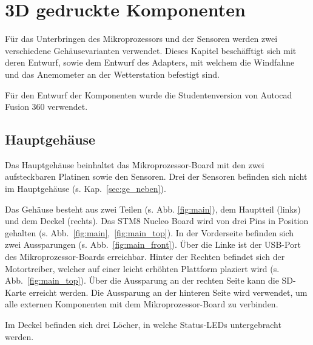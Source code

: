 \pagebreak
\section{3D gedruckte Komponenten}\label{sec:gehaeuse}
Für das Unterbringen des Mikroprozessors und der Sensoren werden zwei verschiedene Gehäusevarianten verwendet. Dieses Kapitel beschäfftigt sich mit deren Entwurf, sowie dem Entwurf des Adapters, mit welchem die Windfahne und das Anemometer an der Wetterstation befestigt sind.

Für den Entwurf der Komponenten wurde die Studentenversion von Autocad Fusion 360 verwendet.

\subsection{Hauptgehäuse}\label{sec:ge_haupt}
Das Hauptgehäuse beinhaltet das Mikroprozessor-Board mit den zwei aufsteckbaren Platinen sowie den Sensoren. Drei der Sensoren befinden sich nicht im Hauptgehäuse (s. Kap.~\ref{sec:ge_neben}).

Das Gehäuse besteht aus zwei Teilen (s. Abb. \ref{fig:main}), dem Hauptteil (links) und dem Deckel (rechts). Das STM8 Nucleo Board wird von drei Pins in Position gehalten (s. Abb.~\ref{fig:main},~\ref{fig:main_top}). In der Vorderseite befinden sich zwei Aussparungen (s. Abb.~\ref{fig:main_front}). Über die Linke ist der USB-Port des Mikroprozessor-Boards erreichbar. Hinter der Rechten befindet sich der Motortreiber, welcher auf einer leicht erhöhten Plattform plaziert wird (s. Abb.~\ref{fig:main_top}). Über die Aussparung an der rechten Seite kann die SD-Karte erreicht werden. Die Aussparung an der hinteren Seite wird verwendet, um alle externen Komponenten mit dem Mikroprozessor-Board zu verbinden.

Im Deckel befinden sich drei Löcher, in welche Status-LEDs untergebracht werden.

